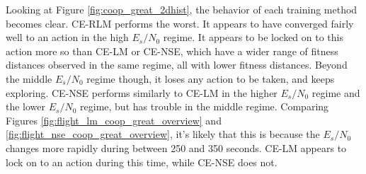 \par Looking at Figure \ref{fig:coop_great_2dhist}, the behavior of each training method becomes clear. CE-RLM performs the worst. It appears to have converged fairly well to an action in the high $E_s/N_0$ regime. It appears to be locked on to this action more so than CE-LM or CE-NSE, which have a wider range of fitness distances observed in the same regime, all with lower fitness distances. Beyond the middle $E_s/N_0$ regime though, it loses any action to be taken, and keeps exploring. CE-NSE performs similarly to CE-LM in the higher $E_s/N_0$ regime and the lower $E_s/N_0$ regime, but has trouble in the middle regime. Comparing Figures \ref{fig:flight_lm_coop_great_overview} and \ref{fig:flight_nse_coop_great_overview}, it's likely that this is because the $E_s/N_0$ changes more rapidly during between 250 and 350 seconds. CE-LM appears to lock on to an action during this time, while CE-NSE does not. 



	
